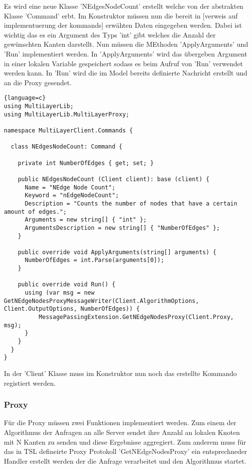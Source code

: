 Es wird eine neue Klasse 'NEdgesNodeCount' erstellt welche von der abstrakten Klasse 'Command' erbt. Im Konstruktor müssen nun die bereit in [verweis auf implementuerung der kommands] erwähten Daten eingegeben werden. Dabei ist wichtig das es ein Argument des Typs 'int' gibt welches die Anzahl der gewünschten Kanten darstellt.
Nun müssen die MEthoden 'ApplyArguments' und 'Run' implementiert werden.
In 'ApplyArguments' wird das übergeben Argument in einer lokalen Variable gespeichert sodass es beim Aufruf von 'Run' verwendet werden kann.
In 'Run' wird die im Model bereits definierte Nachricht erstellt und an die Proxy gesendet.

\begin{lstlisting}{language=c}
using MultiLayerLib;
using MultiLayerLib.MultiLayerProxy;

namespace MultiLayerClient.Commands {

  class NEdgesNodeCount: Command {

    private int NumberOfEdges { get; set; }

    public NEdgesNodeCount (Client client): base (client) {
      Name = "NEdge Node Count";
      Keyword = "nEdgeNodeCount";
      Description = "Counts the number of nodes that have a certain amount of edges.";
      Arguments = new string[] { "int" };
      ArgumentsDescription = new string[] { "NumberOfEdges" };
    }

    public override void ApplyArguments(string[] arguments) {
      NumberOfEdges = int.Parse(arguments[0]);
    }

    public override void Run() {
      using (var msg = new GetNEdgeNodesProxyMessageWriter(Client.AlgorithmOptions, Client.OutputOptions, NumberOfEdges)) {
          MessagePassingExtension.GetNEdgeNodesProxy(Client.Proxy, msg);
      }      
    }
  }
}
\end{lstlisting}


In der 'Client' Klasse muss im Konstruktor nun noch das erstellte Kommando registiert werden.

\subsubsection{Proxy}

Für die Proxy müssen zwei Funktionen implementiert werden. Zum einem der Algorithmus der Anfragen an alle Server sendet ihre Anzahl an lokalen Knoten mit N Kanten zu senden und diese Ergebnisse aggregiert. Zum anderem muss 
für das in TSL defineirte Proxy Protokoll 'GetNEdgeNodesProxy' ein entsprechneder Handler erstellt werden der die Anfrage verarbeitet und den Algorithmus startet.

